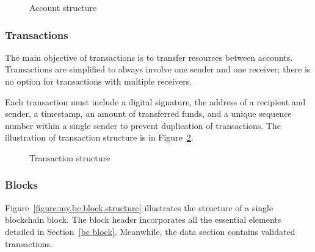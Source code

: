 \begin{figure}[h]
    \begin{center}
    \end{center}
    \caption{Account structure}
    \label{figure:my.bc.account.structure}
\end{figure}

\subsubsection{Transactions}

The main objective of transactions is to transfer resources between accounts. Transactions are simplified to always involve one sender and one receiver; there is no option for transactions with multiple receivers.

Each transaction must include a digital signature, the address of a recipient and sender, a timestamp, an amount of transferred funds, and a unique sequence number within a single sender to prevent duplication of transactions. The illustration of transaction structure is in Figure~\ref{figure:my.bc.transaction.structure}.

\begin{figure}[h]
    \begin{center}
    \end{center}
    \caption{Transaction structure}
    \label{figure:my.bc.transaction.structure}
\end{figure}

\subsubsection{Blocks}

Figure~\ref{figure:my.bc.block.structure} illustrates the structure of a single blockchain block. The block header incorporates all the essential elements detailed in Section~\ref{bc block}. Meanwhile, the data section contains validated transactions.

